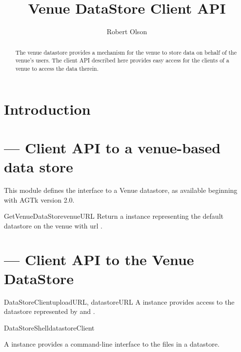 \documentclass{howto}
\title{Venue DataStore Client API}
\author{Robert Olson}
\begin{document}
\maketitle

\begin{abstract}
\noindent
The venue datastore provides a mechanism for the venue to store data
on behalf of the venue's users. The client API described here provides
easy access for the clients of a venue to access the data therein.
\end{abstract}

\tableofcontents

\section{Introduction \label{intro}}

%
%

\section{ --- Client API to a
venue-based data store}

This module defines the interface to a Venue datastore, as available
beginning with AGTk version 2.0. 

\begin{funcdesc}{GetVenueDataStore}{venueURL}
Return a   instance representing the default
datastore on the venue with url .
\end{funcdesc}

\section{ --- Client API to the
Venue DataStore}



\begin{classdesc}{DataStoreClient}{uploadURL, datastoreURL}
A   instance provides access to the datastore
represented by  and .

\end{classdesc}

\begin{classdesc}{DataStoreShell}{datastoreClient}

A  instance provides a command-line interface to
the files in a datastore.

\end{classdesc}
\end{document}
